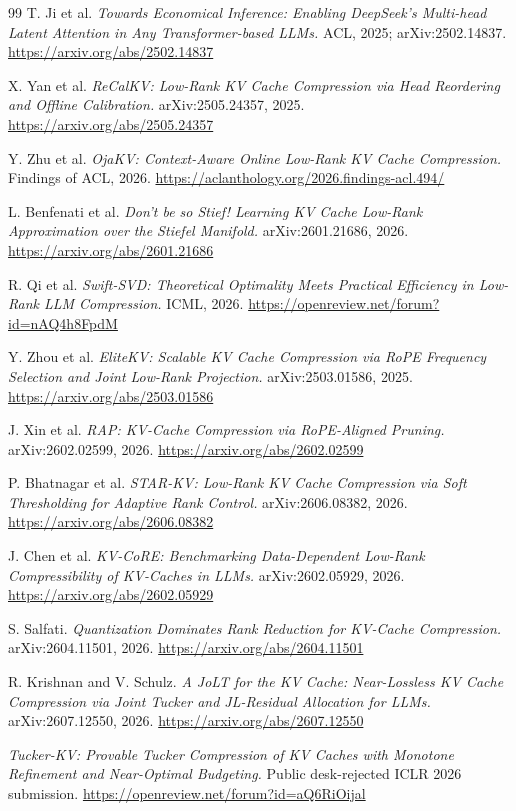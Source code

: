 \documentclass[10pt]{article}
\begin{document}
\begin{thebibliography}{99}
 T. Ji et al. \emph{Towards Economical Inference: Enabling DeepSeek's Multi-head
Latent Attention in Any Transformer-based LLMs.} ACL, 2025; arXiv:2502.14837.
\url{https://arxiv.org/abs/2502.14837}

 X. Yan et al. \emph{ReCalKV: Low-Rank KV Cache Compression via Head Reordering
and Offline Calibration.} arXiv:2505.24357, 2025. \url{https://arxiv.org/abs/2505.24357}

 Y. Zhu et al. \emph{OjaKV: Context-Aware Online Low-Rank KV Cache Compression.}
Findings of ACL, 2026. \url{https://aclanthology.org/2026.findings-acl.494/}

 L. Benfenati et al. \emph{Don't be so Stief! Learning KV Cache Low-Rank
Approximation over the Stiefel Manifold.} arXiv:2601.21686, 2026.
\url{https://arxiv.org/abs/2601.21686}

 R. Qi et al. \emph{Swift-SVD: Theoretical Optimality Meets Practical Efficiency
in Low-Rank LLM Compression.} ICML, 2026.
\url{https://openreview.net/forum?id=nAQ4h8FpdM}

 Y. Zhou et al. \emph{EliteKV: Scalable KV Cache Compression via RoPE Frequency
Selection and Joint Low-Rank Projection.} arXiv:2503.01586, 2025.
\url{https://arxiv.org/abs/2503.01586}

 J. Xin et al. \emph{RAP: KV-Cache Compression via RoPE-Aligned Pruning.}
arXiv:2602.02599, 2026. \url{https://arxiv.org/abs/2602.02599}

 P. Bhatnagar et al. \emph{STAR-KV: Low-Rank KV Cache Compression via Soft
Thresholding for Adaptive Rank Control.} arXiv:2606.08382, 2026.
\url{https://arxiv.org/abs/2606.08382}

 J. Chen et al. \emph{KV-CoRE: Benchmarking Data-Dependent Low-Rank Compressibility
of KV-Caches in LLMs.} arXiv:2602.05929, 2026. \url{https://arxiv.org/abs/2602.05929}

 S. Salfati. \emph{Quantization Dominates Rank Reduction for KV-Cache
Compression.} arXiv:2604.11501, 2026. \url{https://arxiv.org/abs/2604.11501}

 R. Krishnan and V. Schulz. \emph{A JoLT for the KV Cache: Near-Lossless KV Cache
Compression via Joint Tucker and JL-Residual Allocation for LLMs.} arXiv:2607.12550, 2026.
\url{https://arxiv.org/abs/2607.12550}

 \emph{Tucker-KV: Provable Tucker Compression of KV Caches with Monotone
Refinement and Near-Optimal Budgeting.} Public desk-rejected ICLR 2026 submission.
\url{https://openreview.net/forum?id=aQ6RiOijal}


\end{thebibliography}
\end{document}
